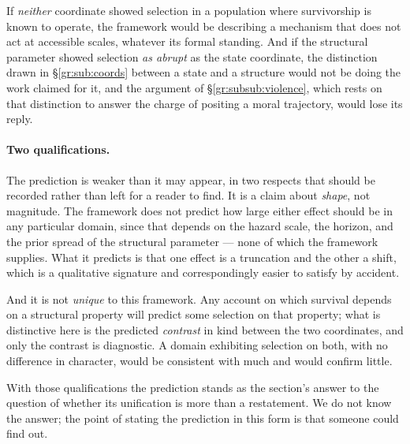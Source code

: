 \documentclass[11pt]{article}
\numberwithin{equation}{section}
\theoremstyle{plain}
\theoremstyle{definition}
\theoremstyle{remark}
\begin{document}
If \emph{neither} coordinate showed selection in a population where
survivorship is known to operate, the framework would be describing a
mechanism that does not act at accessible scales, whatever its formal
standing. And if the structural parameter showed selection \emph{as abrupt} as
the state coordinate, the distinction drawn in
\S\ref{gr:sub:coords} between a state and a structure would not be doing
the work claimed for it, and the argument of
\S\ref{gr:subsub:violence}, which rests on that distinction to answer
the charge of positing a moral trajectory, would lose its reply.

\paragraph{Two qualifications.}

The prediction is weaker than it may appear, in two respects that should
be recorded rather than left for a reader to find. It is a claim about \emph{shape}, not magnitude. The framework does not
predict how large either effect should be in any particular domain,
since that depends on the hazard scale, the horizon, and the prior
spread of the structural parameter --- none of which the framework
supplies. What it predicts is that one effect is a truncation and the
other a shift, which is a qualitative signature and correspondingly
easier to satisfy by accident.

And it is not \emph{unique} to this framework. Any account on which
survival depends on a structural property will predict some selection on
that property; what is distinctive here is the predicted \emph{contrast}
in kind between the two coordinates, and only the contrast is
diagnostic. A domain exhibiting selection on both, with no difference in
character, would be consistent with much and would confirm little.

With those qualifications the prediction stands as the section's answer
to the question of whether its unification is more than a restatement.
We do not know the answer; the point of stating the prediction in this
form is that someone could find out.
\end{document}

